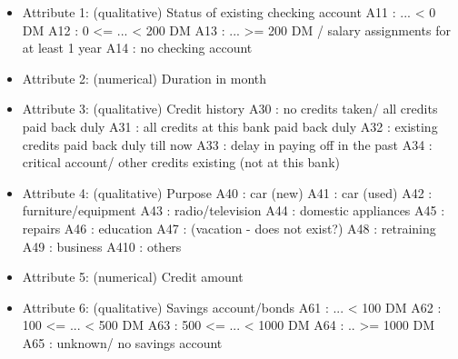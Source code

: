 \documentclass[10pt]{article}\usepackage[]{graphicx}\usepackage[]{color}
\begin{document}
\begin{itemize}
\item Attribute 1: (qualitative) Status of existing checking account 
\newline A11 : ... < 0 DM 
\newline A12 : 0 <= ... < 200 DM 
\newline A13 : ... >= 200 DM / salary assignments for at least 1 year 
\newline A14 : no checking account 

\item Attribute 2: (numerical) Duration in month 

\item Attribute 3: (qualitative) Credit history 
\newline A30 : no credits taken/ all credits paid back duly 
\newline A31 : all credits at this bank paid back duly 
\newline A32 : existing credits paid back duly till now 
\newline A33 : delay in paying off in the past 
\newline A34 : critical account/ other credits existing (not at this bank) 

\item Attribute 4: (qualitative) Purpose 
\newline A40 : car (new) 
\newline A41 : car (used) 
\newline A42 : furniture/equipment 
\newline A43 : radio/television 
\newline A44 : domestic appliances 
\newline A45 : repairs 
\newline A46 : education 
\newline A47 : (vacation - does not exist?) 
\newline A48 : retraining 
\newline A49 : business 
\newline A410 : others 

\item Attribute 5: (numerical) Credit amount 

\item Attribute 6: (qualitative) Savings account/bonds 
\newline A61 : ... < 100 DM 
\newline A62 : 100 <= ... < 500 DM 
\newline A63 : 500 <= ... < 1000 DM 
\newline A64 : .. >= 1000 DM 
\newline A65 : unknown/ no savings account 


\end{itemize}
\end{document}

